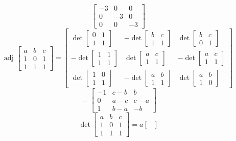\documentclass[12pt]{article}
\begin{document}
\begin{itemize}
$$\begin{bmatrix}
-3 & 0 & 0 \\
0 & -3 & 0 \\
0 & 0 & -3
\end{bmatrix}$$
$$\text{adj }\begin{bmatrix}
a & b & c \\
1 & 0 & 1 \\
1 & 1 & 1
\end{bmatrix} = \begin{bmatrix}
\det\begin{bmatrix}
0 & 1 \\
1 & 1
\end{bmatrix} & -\det\begin{bmatrix}
b & c \\
1 & 1
\end{bmatrix} & \det\begin{bmatrix}
b & c \\
0 & 1
\end{bmatrix} \\
-\det\begin{bmatrix}
1 & 1 \\
1 & 1
\end{bmatrix} & \det\begin{bmatrix}
a & c \\
1 & 1
\end{bmatrix} & -\det\begin{bmatrix}
a & c \\
1 & 1
\end{bmatrix} \\
\det\begin{bmatrix}
1 & 0 \\
1 & 1
\end{bmatrix} & -\det\begin{bmatrix}
a & b \\
1 & 1
\end{bmatrix} & \det\begin{bmatrix}
a & b \\
1 & 0
\end{bmatrix}
\end{bmatrix}$$
$$= \begin{bmatrix}
-1 & c - b & b \\
0 & a - c & c - a \\
1 & b - a & -b
\end{bmatrix}$$
$$\det\begin{bmatrix}
a & b & c \\
1 & 0 & 1 \\
1 & 1 & 1
\end{bmatrix} = a\begin{bmatrix}

\end{bmatrix}$$
\end{itemize}
\end{document}
